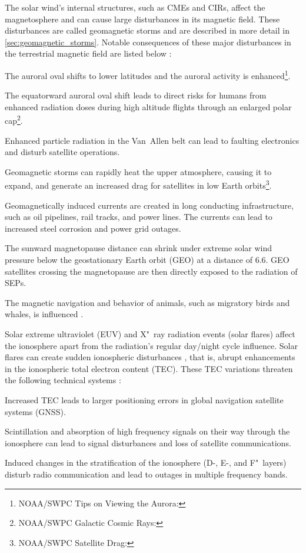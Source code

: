 The solar wind's internal structures, such as CMEs and CIRs, affect the magnetosphere and can cause large disturbances in its magnetic field. These disturbances are called geomagnetic storms and are described in more detail in \autoref{sec:geomagnetic_storms}. Notable consequences of these major disturbances in the terrestrial magnetic field are listed below \citep{Bothmer2007}:
\begin{itemize*}
	\item The auroral oval shifts to lower latitudes and the auroral activity is enhanced\footnote{NOAA/SWPC Tips on Viewing the Aurora: }.
	\item The equatorward auroral oval shift leads to direct risks for humans from enhanced radiation doses during high altitude flights through an enlarged polar cap\footnote{NOAA/SWPC Galactic Cosmic Rays: }.
	\item Enhanced particle radiation in the Van~Allen belt can lead to faulting electronics and disturb satellite operations.
	\item Geomagnetic storms can rapidly heat the upper atmosphere, causing it to expand, and generate an increased drag for satellites in low Earth orbits\footnote{NOAA/SWPC Satellite Drag: }.
	\item Geomagnetically induced currents are created in long conducting infrastructure, such as oil pipelines, rail tracks, and power lines. The currents can lead to increased steel corrosion and power grid outages.
	\item The sunward magnetopause distance can shrink under extreme solar wind pressure below the geostationary Earth orbit (GEO) at a distance of \SI{6.6}{\RE}. GEO satellites crossing the magnetopause are then directly exposed to the radiation of SEPs.
	\item The magnetic navigation and behavior of animals, such as migratory birds \citep{Moore1977} and whales, is influenced \citep{Vanselow2017}.
\end{itemize*}

Solar extreme ultraviolet (EUV) and X"~ray radiation events (solar flares) affect the ionosphere apart from the radiation's regular day/night cycle influence. Solar flares can create sudden ionospheric disturbances \citep{Gosling1993}, that is, abrupt enhancements in the ionospheric total electron content (TEC). These TEC variations threaten the following technical systems \citep{Kraaikamp2015}:
\begin{itemize*}
	\item Increased TEC leads to larger positioning errors in global navigation satellite systems (GNSS).
	\item Scintillation and absorption of high frequency signals on their way through the ionosphere can lead to signal disturbances and loss of satellite communications.
	\item Induced changes in the stratification of the ionosphere (D-, E-, and F"~layers) disturb radio communication and lead to outages in multiple frequency bands.
\end{itemize*}

